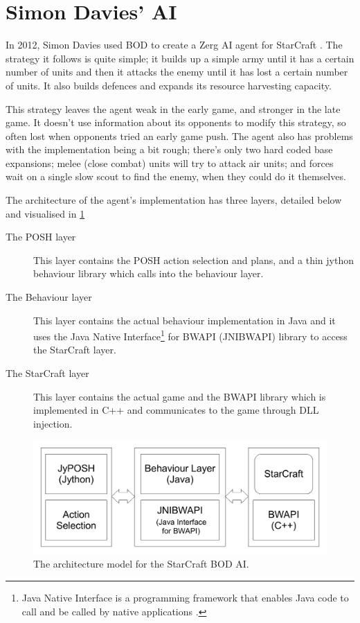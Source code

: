 \documentclass[11pt,openright,a4paper]{report}
\begin{document}
\section{Simon Davies' AI}
In 2012, Simon Davies used BOD to create a Zerg AI agent for StarCraft \cite{davies2012}. The strategy it follows is quite simple; it builds up a simple army until it has a certain number of units and then it attacks the enemy until it has lost a certain number of units. It also builds defences and expands its resource harvesting capacity.

This strategy leaves the agent weak in the early game, and stronger in the late game. It doesn't use information about its opponents to modify this strategy, so often lost when opponents tried an early game push. The agent also has problems with the implementation being a bit rough; there's only two hard coded base expansions; melee (close combat) units will try to attack air units; and forces wait on a single slow scout to find the enemy, when they could do it themselves.

The architecture of the agent's implementation has three layers, detailed below and visualised in \ref{fig:AI-Architecture}
\begin{description}
\item[The POSH layer] This layer contains the POSH action selection and plans, and a thin jython behaviour library which calls into the behaviour layer.
\item[The Behaviour layer] This layer contains the actual behaviour implementation in Java and it uses the Java Native Interface\footnote{Java Native Interface is a programming framework that enables Java code to call and be called by native applications \cite{JNIDef}.} for BWAPI (JNIBWAPI) library \cite{JNIBWAPI} to access the StarCraft layer.
\item[The StarCraft layer] This layer contains the actual game and the BWAPI library which is implemented in C++ and communicates to the game through DLL injection.
\end{description}
\begin{figure}[h]
    \centering
    \includegraphics[scale=0.5]{AIArch}
    \caption{The architecture model for the StarCraft BOD AI. \protect\cite{davies2012}}
    \label{fig:AI-Architecture}
\end{figure}
\end{document}
